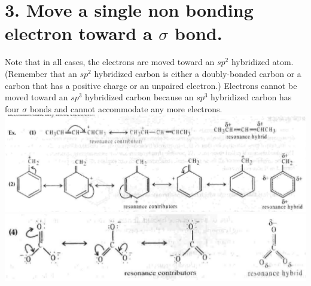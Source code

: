 \documentclass[10pt]{article}
\begin{document}
\section*{3. Move a single non bonding electron toward a $\sigma$ bond.}
Note that in all cases, the electrons are moved toward an $s p^{2}$ hybridized atom. (Remember that an $s p^{2}$ hybridized carbon is either a doubly-bonded carbon or a carbon that has a positive charge or an unpaired electron.) Electrons cannot be moved toward an $s p^{3}$ hybridized carbon because an $s p^{3}$ hybridized carbon has four $\sigma$ bonds and cannot accommodate any more electrons.\\
\includegraphics[max width=\textwidth, center]{2025_01_28_8470952b98110cec3aabg-070}\\
\includegraphics[max width=\textwidth, center]{2025_01_28_8470952b98110cec3aabg-071(2)}
\end{document}
